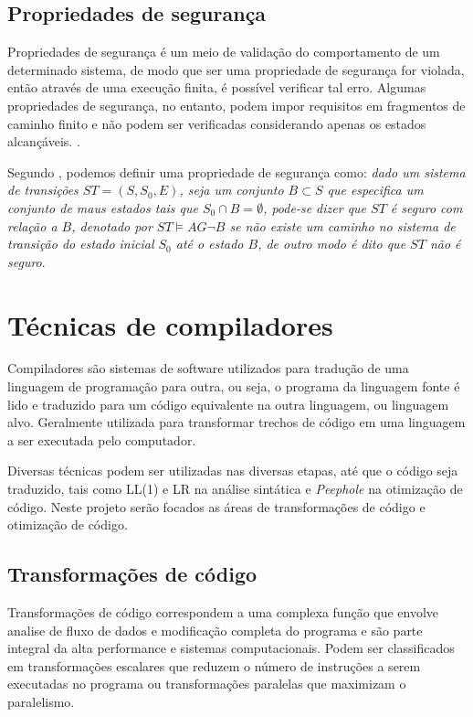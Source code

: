 \subsection{Propriedades de segurança}
Propriedades de segurança é um meio de validação do comportamento de um determinado sistema, de modo que ser uma propriedade de segurança for violada, então através de uma execução finita, é possível verificar tal erro. Algumas propriedades de segurança, no entanto, podem impor requisitos em fragmentos de caminho finito e não podem ser verificadas considerando apenas os estados alcançáveis. \cite{baier2008principles}.

\par
Segundo \cite{clarke2003verification}, podemos definir uma propriedade de segurança como: \textit{dado um sistema de transições $ST = (S, S_0, E)$, seja um conjunto $B \subset S$ que especifica um conjunto de maus estados tais que $S_0 \cap B = \emptyset$, pode-se dizer que $ST$ é seguro com relação a $B$, denotado por $ST \models AG\neg B$ se não existe um caminho no sistema de transição do estado inicial $S_0$ até o estado $B$, de outro modo é dito que $ST$ não é seguro}.
\section{Técnicas de compiladores}
\par
Compiladores são sistemas de software utilizados para tradução de uma linguagem de programação para outra, ou seja, o programa da linguagem fonte é lido e traduzido para um código equivalente na outra linguagem, ou linguagem alvo. Geralmente utilizada para transformar trechos de código em uma linguagem a ser executada pelo computador\cite{aho2007compilers}. 

\par
Diversas técnicas podem ser utilizadas nas diversas etapas, até que o código seja traduzido, tais como LL(1) e LR na análise sintática e \textit{Peephole} na otimização de código\cite{aho2007compilers}. Neste projeto serão focados as áreas de transformações de código e otimização de código.
\subsection{Transformações de código}
\par
Transformações de código correspondem a uma complexa função que envolve analise de fluxo de dados e modificação completa do programa e são parte integral da alta performance e sistemas computacionais. Podem ser classificados em transformações escalares que reduzem o número de instruções a serem executadas no programa ou transformações paralelas que maximizam o paralelismo.\cite{srikant2002compiler}

